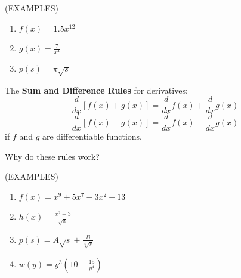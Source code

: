 \documentclass[11pt]{article}
\begin{document}
\vspace{0.2in}

(EXAMPLES)\\

\begin{enumerate}
\item{$f(x) = 1.5x^{12}$}
  \vspace{0.3in}
\item{$g(x) = \frac{7}{x^4}$}
  \vspace{0.3in}
\item{$p(s) = \pi\sqrt{s}$}
  \vspace{0.3in}
\end{enumerate}


The {\bf Sum and Difference Rules} for derivatives:
\begin{displaymath}
\frac{d}{dx}\left[f(x) + g(x)  \right] = \frac{d}{dx}f(x) + \frac{d}{dx}g(x)
  \end{displaymath}
\begin{displaymath}
\frac{d}{dx}\left[f(x) - g(x)  \right] = \frac{d}{dx}f(x) - \frac{d}{dx}g(x)
  \end{displaymath}
if $f$ and $g$ are differentiable functions.

  \vspace{0.2in}

Why do these rules work?  

\pagebreak


(EXAMPLES)\\

\begin{enumerate}
\item{$f(x) = x^9 + 5x^7 - 3x^2 + 13$}
  \vspace{0.4in}
\item{$h(x) = \frac{x^2-3}{\sqrt{x}}$}
  \vspace{0.4in}
\item{$p(s) = A\sqrt{s} + \frac{B}{\sqrt[4]{s}}$}
  \vspace{0.4in}
\item{$w(y) = y^3\left(10-\frac{15}{y^4}\right)$}
    \vspace{0.4in}
\end{enumerate}

    \vspace{0.3in}
\end{document}
